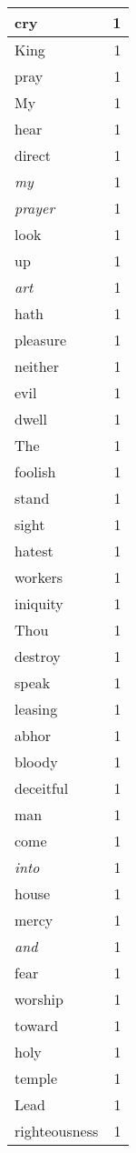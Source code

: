 \begin{center}
\begin{longtable}{l|r}
cry & 1 \\ \hline
King & 1 \\ \hline
pray & 1 \\ \hline
My & 1 \\ \hline
hear & 1 \\ \hline
direct & 1 \\ \hline
\emph{my} & 1 \\ \hline
\emph{prayer} & 1 \\ \hline
look & 1 \\ \hline
up & 1 \\ \hline
\emph{art} & 1 \\ \hline
hath & 1 \\ \hline
pleasure & 1 \\ \hline
neither & 1 \\ \hline
evil & 1 \\ \hline
dwell & 1 \\ \hline
The & 1 \\ \hline
foolish & 1 \\ \hline
stand & 1 \\ \hline
sight & 1 \\ \hline
hatest & 1 \\ \hline
workers & 1 \\ \hline
iniquity & 1 \\ \hline
Thou & 1 \\ \hline
destroy & 1 \\ \hline
speak & 1 \\ \hline
leasing & 1 \\ \hline
abhor & 1 \\ \hline
bloody & 1 \\ \hline
deceitful & 1 \\ \hline
man & 1 \\ \hline
come & 1 \\ \hline
\emph{into} & 1 \\ \hline
house & 1 \\ \hline
mercy & 1 \\ \hline
\emph{and} & 1 \\ \hline
fear & 1 \\ \hline
worship & 1 \\ \hline
toward & 1 \\ \hline
holy & 1 \\ \hline
temple & 1 \\ \hline
Lead & 1 \\ \hline
righteousness & 1 \\ \hline

\end{longtable}
\end{center}
